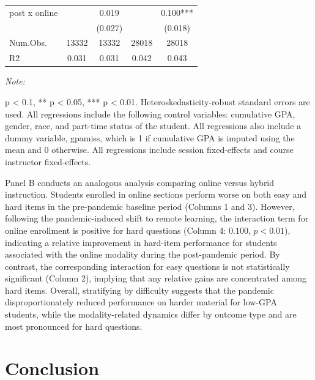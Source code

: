 \documentclass[
  12pt,
  letterpaper,
  DIV=11,
  numbers=noendperiod]{scrartcl}
\begin{document}
\begin{table}[H]
{\begin{threeparttable}
\begin{tabular}[t]{>{\raggedright\arraybackslash}p{15em}cccc}
\hspace{1em}post x online &  & 0.019 &  & 0.100***\\
\hspace{1em} &  & (0.027) &  & (0.018)\\
\hspace{1em}Num.Obs. & 13332 & 13332 & 28018 & 28018\\
\hspace{1em}R2 & 0.031 & 0.031 & 0.042 & 0.043\\
\bottomrule
\end{tabular}
\begin{tablenotes}[para]
\item \textit{Note: } 
\item * p < 0.1, ** p < 0.05, *** p < 0.01. Heteroskedasticity-robust standard errors are used. All regressions include the following control variables: cumulative GPA, gender, race, and part-time status of the student. All regressions also include a dummy variable, gpamiss, which is 1 if cumulative
    GPA is imputed using the mean and 0 otherwise. All regressions include session fixed-effects and course instructor fixed-effects.
\end{tablenotes}
\end{threeparttable}}
\endgroup{}
\end{table}

Panel B conducts an analogous analysis comparing online versus hybrid
instruction. Students enrolled in online sections perform worse on both
easy and hard items in the pre-pandemic baseline period (Columns 1 and
3). However, following the pandemic-induced shift to remote learning,
the interaction term for online enrollment is positive for hard
questions (Column 4: \(0.100\), \(p < 0.01\)), indicating a relative
improvement in hard-item performance for students associated with the
online modality during the post-pandemic period. By contrast, the
corresponding interaction for easy questions is not statistically
significant (Column 2), implying that any relative gains are
concentrated among hard items. Overall, stratifying by difficulty
suggests that the pandemic disproportionately reduced performance on
harder material for low-GPA students, while the modality-related
dynamics differ by outcome type and are most pronounced for hard
questions.

\section{Conclusion}\label{conclusion}
\end{document}
